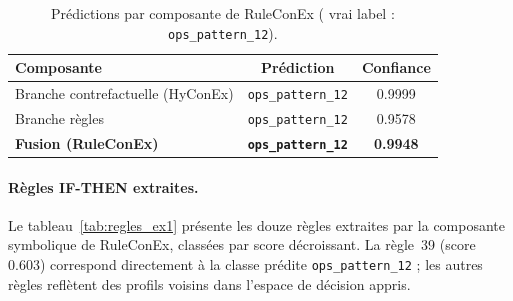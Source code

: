 \documentclass[12pt,a4paper]{article}
\begin{document}
\begin{table}[htbp]
  \centering
  \caption{Prédictions par composante de RuleConEx (
           vrai label : \texttt{ops\_pattern\_12}).}
  \label{tab:branches_ex1}
  \small
  \begin{tabular}{lcc}
    \toprule
    \textbf{Composante} & \textbf{Prédiction} & \textbf{Confiance} \\
    \midrule
    Branche contrefactuelle (HyConEx) & \texttt{ops\_pattern\_12} & 0.9999 \\
    Branche règles                    & \texttt{ops\_pattern\_12} & 0.9578 \\
    \textbf{Fusion (RuleConEx)}       & \textbf{\texttt{ops\_pattern\_12}} & \textbf{0.9948} \\
    \bottomrule
  \end{tabular}
\end{table}

\paragraph{Règles IF-THEN extraites.}
Le tableau~\ref{tab:regles_ex1} présente les douze règles extraites par la
composante symbolique de RuleConEx, classées par score décroissant.
La règle~39 (score 0.603) correspond directement à la classe prédite
\texttt{ops\_pattern\_12} ; les autres règles reflètent des profils voisins
dans l'espace de décision appris.
\end{document}

